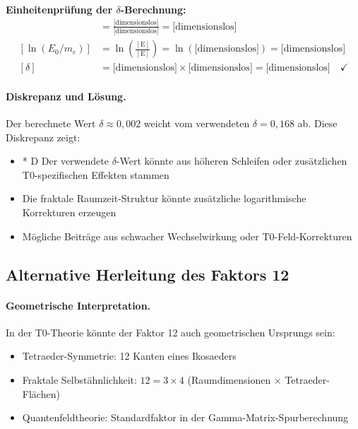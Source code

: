\documentclass[12pt,a4paper]{article}
\theoremstyle{remark}
\begin{document}
\begin{units}
	\textbf{Einheitenprüfung der $\delta$-Berechnung:}
	\begin{align}
		[\alpha/(3\pi)] &= \frac{\text{[dimensionslos]}}{\text{[dimensionslos]}} = \text{[dimensionslos]} \\
		[\ln(E_0/m_e)] &= \ln\left(\frac{[\text{E}]}{[\text{E}]}\right) = \ln(\text{[dimensionslos]}) = \text{[dimensionslos]} \\
		[\delta] &= \text{[dimensionslos]} \times \text{[dimensionslos]} = \text{[dimensionslos]} \quad \checkmark
	\end{align}
\end{units}

\paragraph{Diskrepanz und Lösung.}
Der berechnete Wert $\delta \approx 0{,}002$ weicht vom verwendeten $\delta = 0{,}168$ ab. Diese Diskrepanz zeigt:
\begin{itemize}
	\item * D Der verwendete $\delta$-Wert könnte aus höheren Schleifen oder zusätzlichen T0-spezifischen Effekten stammen
	\item Die fraktale Raumzeit-Struktur könnte zusätzliche logarithmische Korrekturen erzeugen
	\item Mögliche Beiträge aus schwacher Wechselwirkung oder T0-Feld-Korrekturen
\end{itemize}

\subsection{Alternative Herleitung des Faktors 12}

\paragraph{Geometrische Interpretation.}
In der T0-Theorie könnte der Faktor 12 auch geometrischen Ursprungs sein:
\begin{itemize}
	\item Tetraeder-Symmetrie: 12 Kanten eines Ikosaeders
	\item Fraktale Selbstähnlichkeit: $12 = 3 \times 4$ (Raumdimensionen × Tetraeder-Flächen)
	\item Quantenfeldtheorie: Standardfaktor in der Gamma-Matrix-Spurberechnung
\end{itemize}
\end{document}
